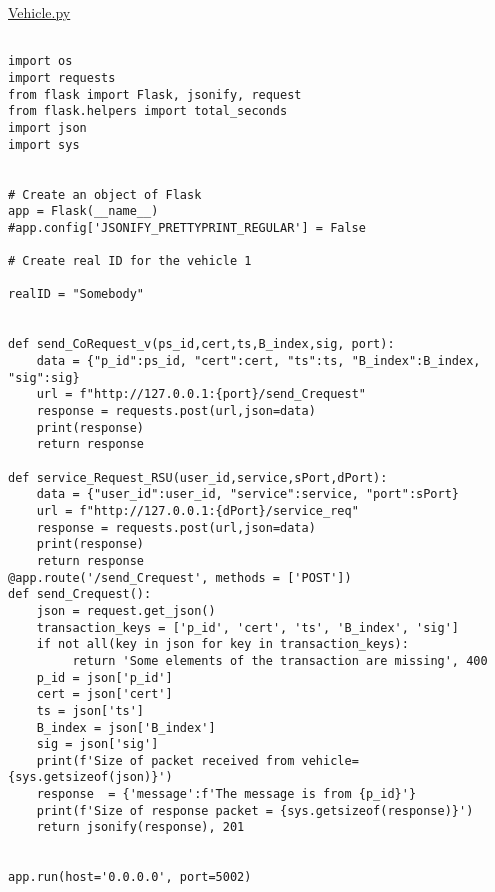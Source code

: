 \begin{linenumbers}
\begin{lstlisting}

\end{lstlisting}
\resetlinenumber[1]
\hypertarget{milp_code}{}
\hyperlink{milp_text}{Vehicle.py}
\begin{lstlisting}

import os
import requests
from flask import Flask, jsonify, request
from flask.helpers import total_seconds
import json
import sys


# Create an object of Flask 
app = Flask(__name__)
#app.config['JSONIFY_PRETTYPRINT_REGULAR'] = False

# Create real ID for the vehicle 1

realID = "Somebody"


def send_CoRequest_v(ps_id,cert,ts,B_index,sig, port):
    data = {"p_id":ps_id, "cert":cert, "ts":ts, "B_index":B_index, "sig":sig}
    url = f"http://127.0.0.1:{port}/send_Crequest"
    response = requests.post(url,json=data)
    print(response)
    return response

def service_Request_RSU(user_id,service,sPort,dPort):
    data = {"user_id":user_id, "service":service, "port":sPort}
    url = f"http://127.0.0.1:{dPort}/service_req"
    response = requests.post(url,json=data)
    print(response)
    return response
@app.route('/send_Crequest', methods = ['POST'])
def send_Crequest():
    json = request.get_json()
    transaction_keys = ['p_id', 'cert', 'ts', 'B_index', 'sig']
    if not all(key in json for key in transaction_keys):
         return 'Some elements of the transaction are missing', 400
    p_id = json['p_id']
    cert = json['cert']
    ts = json['ts']
    B_index = json['B_index']
    sig = json['sig']
    print(f'Size of packet received from vehicle= {sys.getsizeof(json)}')
    response  = {'message':f'The message is from {p_id}'}
    print(f'Size of response packet = {sys.getsizeof(response)}')
    return jsonify(response), 201


app.run(host='0.0.0.0', port=5002)

\end{lstlisting}
\end{linenumbers} 

\newpage

